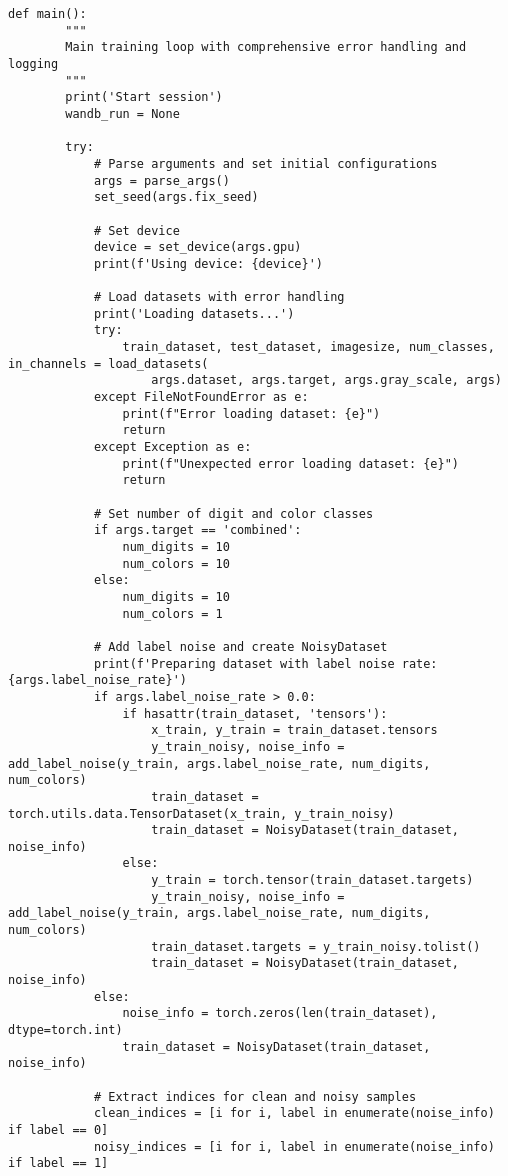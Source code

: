 \begin{lstlisting}[style=pythonstyle, caption={メインコード}]
    def main():
        """
        Main training loop with comprehensive error handling and logging
        """
        print('Start session')
        wandb_run = None
        
        try:
            # Parse arguments and set initial configurations
            args = parse_args()
            set_seed(args.fix_seed)
            
            # Set device
            device = set_device(args.gpu)
            print(f'Using device: {device}')
    
            # Load datasets with error handling
            print('Loading datasets...')
            try:
                train_dataset, test_dataset, imagesize, num_classes, in_channels = load_datasets(
                    args.dataset, args.target, args.gray_scale, args)
            except FileNotFoundError as e:
                print(f"Error loading dataset: {e}")
                return
            except Exception as e:
                print(f"Unexpected error loading dataset: {e}")
                return
    
            # Set number of digit and color classes
            if args.target == 'combined':
                num_digits = 10
                num_colors = 10
            else:
                num_digits = 10
                num_colors = 1
    
            # Add label noise and create NoisyDataset
            print(f'Preparing dataset with label noise rate: {args.label_noise_rate}')
            if args.label_noise_rate > 0.0:
                if hasattr(train_dataset, 'tensors'):
                    x_train, y_train = train_dataset.tensors
                    y_train_noisy, noise_info = add_label_noise(y_train, args.label_noise_rate, num_digits, num_colors)
                    train_dataset = torch.utils.data.TensorDataset(x_train, y_train_noisy)
                    train_dataset = NoisyDataset(train_dataset, noise_info)
                else:
                    y_train = torch.tensor(train_dataset.targets)
                    y_train_noisy, noise_info = add_label_noise(y_train, args.label_noise_rate, num_digits, num_colors)
                    train_dataset.targets = y_train_noisy.tolist()
                    train_dataset = NoisyDataset(train_dataset, noise_info)
            else:
                noise_info = torch.zeros(len(train_dataset), dtype=torch.int)
                train_dataset = NoisyDataset(train_dataset, noise_info)
    
            # Extract indices for clean and noisy samples
            clean_indices = [i for i, label in enumerate(noise_info) if label == 0]
            noisy_indices = [i for i, label in enumerate(noise_info) if label == 1]
    

\end{lstlisting}
